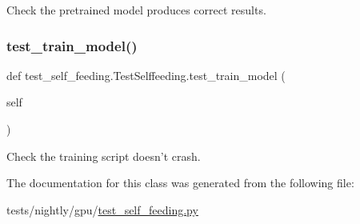 \begin{DoxyVerb}Check the pretrained model produces correct results.
\end{DoxyVerb}
 \mbox{\label{classtest__self__feeding_1_1TestSelffeeding_a98171dd8471ea27cf898db407bae5ef8}} 
\subsubsection{\texorpdfstring{test\+\_\+train\+\_\+model()}{test\_train\_model()}}
{\footnotesize\ttfamily def test\+\_\+self\+\_\+feeding.\+Test\+Selffeeding.\+test\+\_\+train\+\_\+model (\begin{DoxyParamCaption}\item[{}]{self }\end{DoxyParamCaption})}

\begin{DoxyVerb}Check the training script doesn't crash.
\end{DoxyVerb}
 

The documentation for this class was generated from the following file\+:\begin{DoxyCompactItemize}
\item 
tests/nightly/gpu/\hyperlink{test__self__feeding_8py}{test\+\_\+self\+\_\+feeding.\+py}\end{DoxyCompactItemize}
